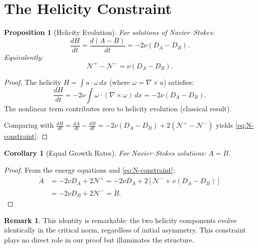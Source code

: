 \documentclass[11pt]{article}
\newtheorem{proposition}[theorem]{Proposition}
\newtheorem{corollary}[theorem]{Corollary}
\theoremstyle{definition}
\newtheorem{remark}[theorem]{Remark}
\newcommand{\cN}{\mathcal{N}}
\begin{document}
\section{The Helicity Constraint}

\begin{proposition}[Helicity Evolution]\label{prop:helicity}
For solutions of Navier--Stokes:
\begin{equation}
\frac{dH}{dt} = \frac{d(A-B)}{dt} = -2\nu(D_A - D_B).
\end{equation}
Equivalently:
\begin{equation}\label{eq:N-constraint}
\cN^+ - \cN^- = \nu(D_A - D_B).
\end{equation}
\end{proposition}

\begin{proof}
The helicity $H = \int u \cdot \omega \, dx$ (where $\omega = \nabla \times u$) satisfies:
\begin{equation}
\frac{dH}{dt} = -2\nu \int \omega \cdot (\nabla \times \omega) \, dx = -2\nu(D_A - D_B).
\end{equation}
The nonlinear term contributes zero to helicity evolution (classical result).

Comparing with $\frac{dH}{dt} = \frac{dA}{dt} - \frac{dB}{dt} = -2\nu(D_A - D_B) + 2(\cN^+ - \cN^-)$ yields \eqref{eq:N-constraint}.
\end{proof}

\begin{corollary}[Equal Growth Rates]\label{cor:AdotBdot}
For Navier--Stokes solutions: $\dot{A} = \dot{B}$.
\end{corollary}

\begin{proof}
From the energy equations and \eqref{eq:N-constraint}:
\begin{align}
\dot{A} &= -2\nu D_A + 2\cN^+ = -2\nu D_A + 2[\cN^- + \nu(D_A - D_B)] \\
&= -2\nu D_B + 2\cN^- = \dot{B}.
\end{align}
\end{proof}

\begin{remark}
This identity is remarkable: the two helicity components evolve identically in the critical norm, regardless of initial asymmetry. This constraint plays no direct role in our proof but illuminates the structure.
\end{remark}
\end{document}
